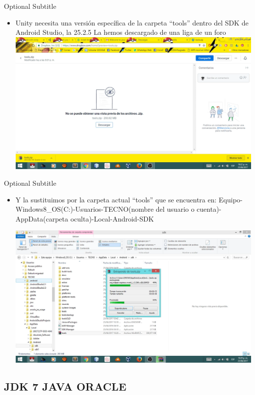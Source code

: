 \documentclass{beamer}
\begin{document}
\begin{frame}{19}{Optional Subtitle}
  \begin{itemize}
  \item {
    Unity necesita una versión específica de la carpeta “tools” dentro del SDK de Android Studio, la 25.2.5
La hemos descargado de una liga de un foro
  }
  \includegraphics[width=\linewidth]{image/IU19}
  \end{itemize}
\end{frame}

\begin{frame}{20}{Optional Subtitle}
  \begin{itemize}
  \item {
   Y la sustituimos por la carpeta actual “tools” que se encuentra en:
	Equipo-Windows8_OS(C:)-Usuarios-TECNO(nombre del usuario o cuenta)-AppData(carpeta oculta)-Local-Android-SDK
  }
  
  \includegraphics[width=\linewidth]{image/IU20}
  \end{itemize}
\end{frame}

\subsection{JDK 7 JAVA ORACLE}
\end{document}
